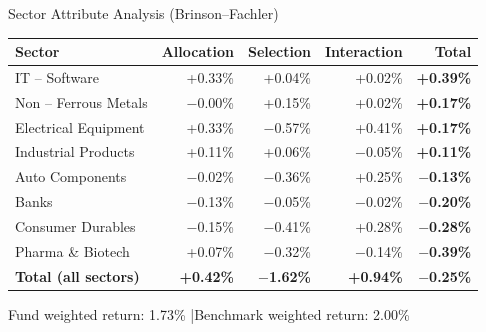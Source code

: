 \documentclass[11pt, aspectratio=43]{beamer}
\begin{document}
\begin{frame}{Sector Attribute Analysis (Brinson--Fachler)}
\centering
\footnotesize
\begin{tabular}{l r r r r}
\toprule
\textbf{Sector} & \textbf{Allocation} & \textbf{Selection} & \textbf{Interaction} & \textbf{Total} \\
\midrule
\rowcolor{lightgray}
IT -- Software & \textcolor{posgreen}{+0.33\%} & +0.04\% & +0.02\% & \textcolor{posgreen}{\textbf{+0.39\%}} \\
Non -- Ferrous Metals & $-$0.00\% & \textcolor{posgreen}{+0.15\%} & +0.02\% & \textcolor{posgreen}{\textbf{+0.17\%}} \\
\rowcolor{lightgray}
Electrical Equipment & \textcolor{posgreen}{+0.33\%} & \textcolor{negred}{$-$0.57\%} & +0.41\% & \textcolor{posgreen}{\textbf{+0.17\%}} \\
Industrial Products & +0.11\% & +0.06\% & $-$0.05\% & \textcolor{posgreen}{\textbf{+0.11\%}} \\
\rowcolor{lightgray}
Auto Components & $-$0.02\% & \textcolor{negred}{$-$0.36\%} & +0.25\% & \textcolor{negred}{\textbf{$-$0.13\%}} \\
Banks & \textcolor{negred}{$-$0.13\%} & $-$0.05\% & $-$0.02\% & \textcolor{negred}{\textbf{$-$0.20\%}} \\
\rowcolor{lightgray}
Consumer Durables & \textcolor{negred}{$-$0.15\%} & \textcolor{negred}{$-$0.41\%} & +0.28\% & \textcolor{negred}{\textbf{$-$0.28\%}} \\
Pharma \& Biotech & +0.07\% & \textcolor{negred}{$-$0.32\%} & $-$0.14\% & \textcolor{negred}{\textbf{$-$0.39\%}} \\
\midrule
\textbf{Total (all sectors)} & \textbf{+0.42\%} & \textbf{$-$1.62\%} & \textbf{+0.94\%} & \textbf{$-$0.25\%} \\
\bottomrule
\end{tabular}

\vspace{0.5em}
\footnotesize
Fund weighted return: 1.73\% \quad|\quad Benchmark weighted return: 2.00\%
\end{frame}
\end{document}
